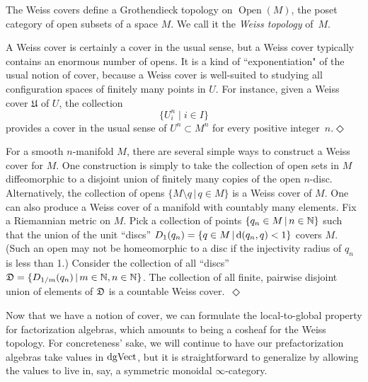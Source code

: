 \documentclass[11pt]{amsart}
\def\mcol{\, | \,}
\def\Open{\operatorname{Open}}
\begin{document}
The Weiss covers define a Grothendieck topology on $\Open(M)$, the poset category of open subsets of a space $M$. We call it the {\em Weiss topology} of~$M$. 

\begin{rmk}
A Weiss cover is certainly a cover in the usual sense, but a Weiss cover typically contains an enormous number of opens. It is a kind of ``exponentiation" of the usual notion of cover, because a Weiss cover is well-suited to studying all configuration spaces of finitely many points in $U$. For instance, given a Weiss cover $\mathfrak{U}$ of $U$, the collection 
\[
\{ U_i^n \mid i \in I\}
\]
provides a cover in the usual sense of $U^n \subset M^n$ for every positive integer~$n$.\hfill$\Diamond$ 
\end{rmk}

\begin{eg}\label{WeissAsExponential}
For a smooth $n$-manifold $M$, there are several simple ways to construct a Weiss cover for $M$. One construction is simply to take the collection of open sets in $M$ diffeomorphic to a disjoint union of finitely many copies of the open $n$-disc. Alternatively, the collection of opens $\{ M \setminus q \mcol q \in M\}$ is a Weiss cover of $M$. One can also produce a Weiss cover of a manifold with countably many elements. Fix a Riemannian metric on $M$. Pick a collection of points $\{q_n\in M \mcol n \in \NN\}$ such that the union of the unit ``discs'' $D_1(q_n) = \{ q \in M \mcol \d(q_n,q) < 1\}$ covers $M$. (Such an open may not be homeomorphic to a disc if the injectivity radius of $q_n$ is less than 1.)  Consider the collection of all ``discs'' $\fD = \{ D_{1/m}(q_n) \mcol m \in \NN, n \in \NN\}$.  The collection of all finite, pairwise disjoint union of elements of $\mathfrak D$ is a countable Weiss cover.~\hfill $\Diamond$ 
\end{eg}

Now that we have a notion of cover, we can formulate the local-to-global property for factorization algebras,
which amounts to being a cosheaf for the Weiss topology.
For concreteness' sake, we will continue to have our prefactorization algebras take values in ${\rm dgVect}$,
but it is straightforward to generalize by allowing the values to live in, say, a symmetric monoidal $\infty$-category.
\end{document}
